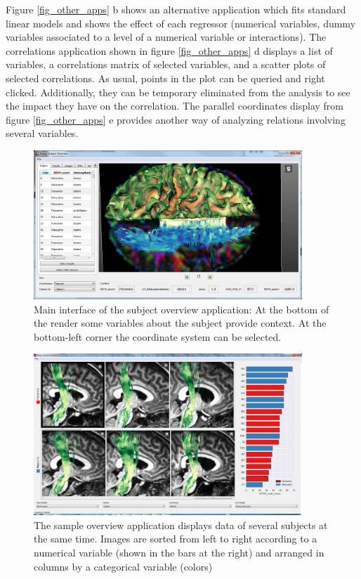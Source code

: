 \documentclass[twocolumn]{svjour3} %
\begin{document}
Figure \ref{fig_other_apps} b shows an alternative application which fits standard linear models and shows the effect of each regressor (numerical variables, dummy variables associated to a level of a numerical variable or interactions). The correlations application shown in figure \ref{fig_other_apps} d displays a list of variables, a correlations matrix of selected variables, and a scatter plots of selected correlations. As usual, points in the plot can be queried and right clicked. Additionally, they can be temporary eliminated from the analysis to see the impact they have on the correlation. The parallel coordinates display from figure \ref{fig_other_apps} e provides another way of analyzing relations involving several variables.

\begin{figure}
\begin{center}
\includegraphics[width=0.9\textwidth]{figures/subj_overview_full.PNG}
\end{center}
 \caption{\label{fig_subject}Main interface of the subject overview application: At the bottom of the render some variables about the subject provide context. At the bottom-left corner the coordinate system can be selected. }
\end{figure}

\begin{figure}
\begin{center}
\includegraphics[width=0.9\textwidth]{figures/sample_overview.PNG}
\end{center}
 \caption{\label{fig_sample} The sample overview application displays data of several subjects at the same time. Images are sorted from left to right according to a numerical variable (shown in the bars at the right) and arranged in columns by a categorical variable (colors)  }
\end{figure}
\end{document}
